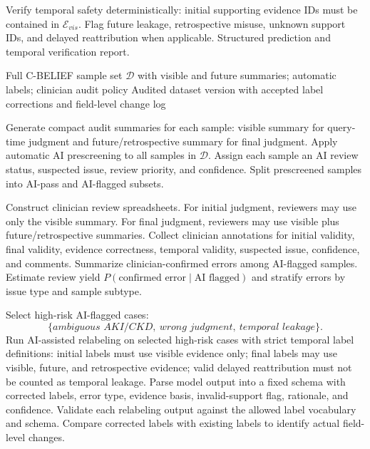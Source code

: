 \begin{algorithm}[t]
\begin{algorithmic}[1]
\State Verify temporal safety deterministically: initial supporting evidence IDs must be contained in $\mathcal{E}_{vis}$.
\State Flag future leakage, retrospective misuse, unknown support IDs, and delayed reattribution when applicable.
\State \Return Structured prediction and temporal verification report.
\end{algorithmic}
\end{algorithm}

\begin{algorithm}[t]
\caption{AI-Assisted Quality Control and Label Refinement Workflow}
\label{alg:cbelief_qc}
\begin{algorithmic}[1]
\Require Full C-BELIEF sample set $\mathcal{D}$ with visible and future summaries; automatic labels; clinician audit policy
\Ensure Audited dataset version with accepted label corrections and field-level change log

\State Generate compact audit summaries for each sample:
\Statex \hspace{\algorithmicindent} visible summary for query-time judgment and future/retrospective summary for final judgment.
\State Apply automatic AI prescreening to all samples in $\mathcal{D}$.
\State Assign each sample an AI review status, suspected issue, review priority, and confidence.
\State Split prescreened samples into AI-pass and AI-flagged subsets.

\State Construct clinician review spreadsheets.
\Statex \hspace{\algorithmicindent} For initial judgment, reviewers may use only the visible summary.
\Statex \hspace{\algorithmicindent} For final judgment, reviewers may use visible plus future/retrospective summaries.
\State Collect clinician annotations for initial validity, final validity, evidence correctness, temporal validity, suspected issue, confidence, and comments.
\State Summarize clinician-confirmed errors among AI-flagged samples.
\State Estimate review yield $P(\text{confirmed error}\mid\text{AI flagged})$ and stratify errors by issue type and sample subtype.

\State Select high-risk AI-flagged cases:
\[
\{\textit{ambiguous AKI/CKD},\ \textit{wrong judgment},\ \textit{temporal leakage}\}.
\]
\State Run AI-assisted relabeling on selected high-risk cases with strict temporal label definitions:
\Statex \hspace{\algorithmicindent} initial labels must use visible evidence only;
\Statex \hspace{\algorithmicindent} final labels may use visible, future, and retrospective evidence;
\Statex \hspace{\algorithmicindent} valid delayed reattribution must not be counted as temporal leakage.
\State Parse model output into a fixed schema with corrected labels, error type, evidence basis, invalid-support flag, rationale, and confidence.
\State Validate each relabeling output against the allowed label vocabulary and schema.
\State Compare corrected labels with existing labels to identify actual field-level changes.


\end{algorithmic}
\end{algorithm}

